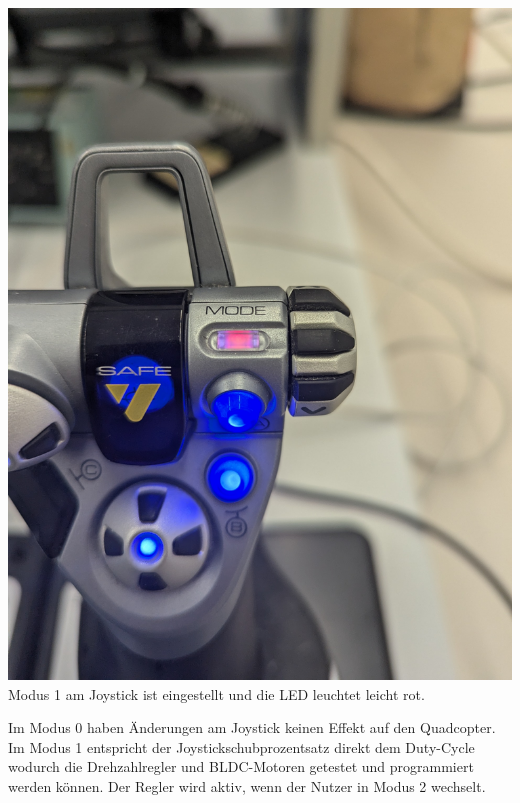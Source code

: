 \begin{center}
	\includegraphics[scale=0.08]{../images/0088 Joystick Mode.jpg}{\\Modus 1 am Joystick ist eingestellt und die LED leuchtet leicht rot.}
\end{center}
Im Modus 0 haben Änderungen am Joystick keinen Effekt auf den Quadcopter. Im Modus 1 entspricht der Joystickschubprozentsatz direkt dem Duty-Cycle wodurch die Drehzahlregler und BLDC-Motoren getestet und programmiert werden können. Der Regler wird aktiv, wenn der Nutzer in Modus 2 wechselt.
